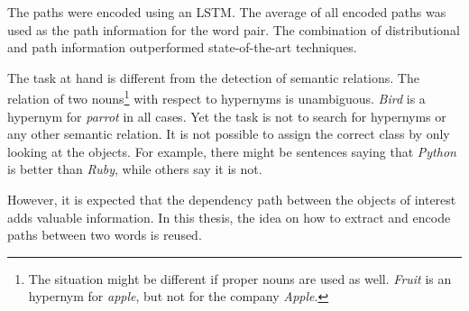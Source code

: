 The paths were encoded using an LSTM. The average of all encoded paths was used as the path information for the word pair. The combination of distributional and path information outperformed state-of-the-art techniques.\newline

The task at hand is different from the detection of semantic relations. The relation of two nouns\footnote{The situation might be different if proper nouns are used as well. \emph{Fruit} is an hypernym for \emph{apple}, but not for the company \emph{Apple}.} with respect to hypernyms is unambiguous. \emph{Bird} is a hypernym for \emph{parrot} in all cases. Yet the task is not to search for hypernyms or any other semantic relation. It is not possible to assign the correct class by only looking at the objects. For example, there might be sentences saying that \emph{Python} is better than \emph{Ruby}, while others say it is not.

However, it is expected that the dependency path between the objects of interest adds valuable information. In this thesis, the idea on how to extract and encode paths between two words is reused.



